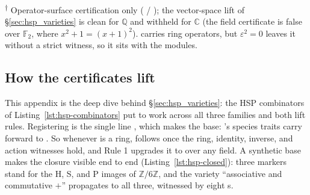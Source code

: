 \documentclass[11pt, a4paper]{article}
\begin{document}
\begin{table}[htbp]
\vspace{0.3em}
\begin{flushleft}
{\footnotesize \textsuperscript{$\dagger$} Operator-surface certification only ( / ); the vector-space lift of §\ref{sec:hsp_varieties} is clean for $\mathbb{Q}$ and withheld for $\mathbb{C}$ (the field certificate is false over $\mathbb{F}_2$, where $x^2+1 = (x+1)^2$).   carries ring operators, but $\varepsilon^2 = 0$ leaves it without a strict  witness, so it sits with the modules.}
\end{flushleft}
\end{table}

\subsection{How the certificates lift}
\label{sec:appendixE-lift}

This appendix is the deep dive behind §\ref{sec:hsp_varieties}: the HSP combinators of Listing~\ref{lst:hsp-combinators} put to work across all three families and both lift rules.
Registering  is the single line , which makes  the base: 's species traits carry forward to .  So whenever  is a ring,  follows once the ring, identity, inverse, and action witnesses hold, and Rule 1 upgrades it to  over any field.
A synthetic base makes the closure visible end to end (Listing~\ref{lst:hsp-closed}): three markers stand for the H, S, and P images of $\mathbb{Z}/6\mathbb{Z}$, and the variety ``associative and commutative $+$'' propagates to all three, witnessed by eight s.
\end{document}
